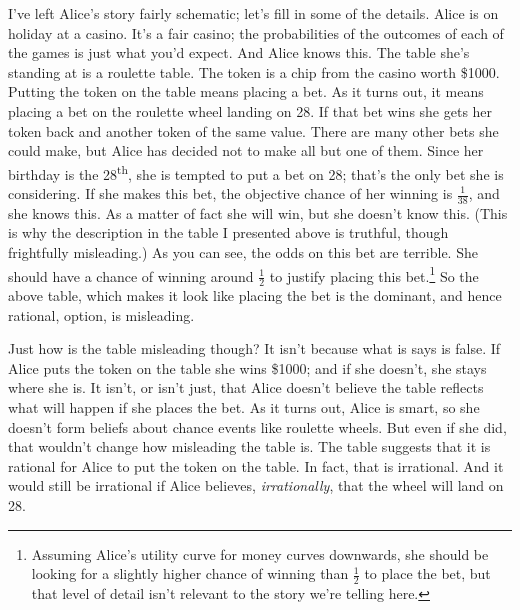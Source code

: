 \documentclass[
  11pt,
  letterpaper,
  DIV=11,
  numbers=noendperiod,
  twoside]{scrartcl}
\begin{document}
I've left Alice's story fairly schematic; let's fill in some of the
details. Alice is on holiday at a casino. It's a fair casino; the
probabilities of the outcomes of each of the games is just what you'd
expect. And Alice knows this. The table she's standing at is a roulette
table. The token is a chip from the casino worth \$1000. Putting the
token on the table means placing a bet. As it turns out, it means
placing a bet on the roulette wheel landing on 28. If that bet wins she
gets her token back and another token of the same value. There are many
other bets she could make, but Alice has decided not to make all but one
of them. Since her birthday is the 28\textsuperscript{th}, she is
tempted to put a bet on 28; that's the only bet she is considering. If
she makes this bet, the objective chance of her winning is
\(\frac{1}{38}\), and she knows this. As a matter of fact she will win,
but she doesn't know this. (This is why the description in the table I
presented above is truthful, though frightfully misleading.) As you can
see, the odds on this bet are terrible. She should have a chance of
winning around \(\frac{1}{2}\) to justify placing this bet.\footnote{Assuming
  Alice's utility curve for money curves downwards, she should be
  looking for a slightly higher chance of winning than \(\frac{1}{2}\)
  to place the bet, but that level of detail isn't relevant to the story
  we're telling here.} So the above table, which makes it look like
placing the bet is the dominant, and hence rational, option, is
misleading.

Just how is the table misleading though? It isn't because what is says
is false. If Alice puts the token on the table she wins \$1000; and if
she doesn't, she stays where she is. It isn't, or isn't just, that Alice
doesn't believe the table reflects what will happen if she places the
bet. As it turns out, Alice is smart, so she doesn't form beliefs about
chance events like roulette wheels. But even if she did, that wouldn't
change how misleading the table is. The table suggests that it is
rational for Alice to put the token on the table. In fact, that is
irrational. And it would still be irrational if Alice believes,
\emph{irrationally}, that the wheel will land on 28.
\end{document}
